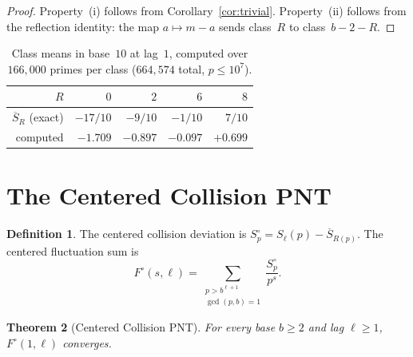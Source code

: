 \documentclass[12pt]{amsart}
\newtheorem{theorem}{Theorem}
\theoremstyle{definition}
\newtheorem{definition}[theorem]{Definition}
\theoremstyle{remark}
\begin{document}
\begin{proof}
Property~(i) follows from
Corollary~\ref{cor:trivial}. Property~(ii)
follows from the reflection identity: the map
$a \mapsto m - a$ sends class~$R$ to class~$b{-}2{-}R$.
\end{proof}

\begin{table}[h]
\centering
\begin{tabular}{rrrrr}
\toprule
$R$ & $0$ & $2$ & $6$ & $8$ \\
\midrule
$\overline{S}_R$ (exact) & $-17/10$ & $-9/10$ & $-1/10$ & $7/10$ \\
computed & $-1.709$ & $-0.897$ & $-0.097$ & $+0.699$ \\
\bottomrule
\end{tabular}
\caption{Class means in base~$10$ at lag~$1$, computed over
$166{,}000$ primes per class ($664{,}574$ total, $p \le 10^7$).}
\label{tab:class-means}
\end{table}

\section{The Centered Collision PNT}

\begin{definition}
The centered collision deviation is
$S^{\circ}_p = S_{\ell}(p) - \overline{S}_{R(p)}$.
The centered fluctuation sum is
\[
F^{\circ}(s, \ell) = \sum_{\substack{p > b^{\ell+1} \\
\gcd(p,b) = 1}} \frac{S^{\circ}_p}{p^s}.
\]
\end{definition}

\begin{theorem}[Centered Collision PNT]\label{thm:cpnt}
For every base $b \ge 2$ and lag $\ell \ge 1$,
$F^{\circ}(1, \ell)$ converges.
\end{theorem}
\end{document}
